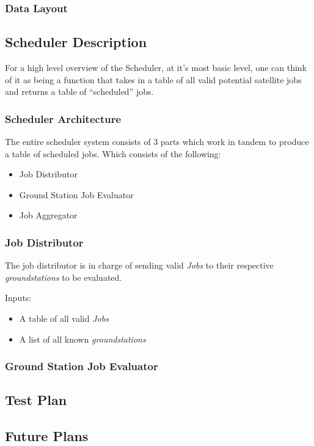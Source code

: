 \documentclass{article}
\begin{document}
\subsubsection{Data Layout}


\subsection{Scheduler Description}

For a high level overview of the Scheduler, at it's most basic level, one can
think of it as being a function that takes in a table of all valid potential
satellite jobs and returns a table of ``scheduled'' jobs.

\subsubsection{Scheduler Architecture}

The entire scheduler system consists of 3 parts which work in tandem to produce
a table of scheduled jobs. Which consists of the following:

\begin{itemize}
\item Job Distributor
\item Ground Station Job Evaluator
\item Job Aggregator
\end{itemize}

\subsubsection{Job Distributor}

The job distributor is in charge of sending valid \textit{Jobs} to their
respective \textit{groundstations} to be evaluated.

\noindent
Inputs:

\begin{itemize}
  \item A table of all valid \textit{Jobs}
  \item A list of all known \textit{groundstations}
\end{itemize}


\subsubsection{Ground Station Job Evaluator}



\subsection{Test Plan}



\subsection{Future Plans}
\end{document}

